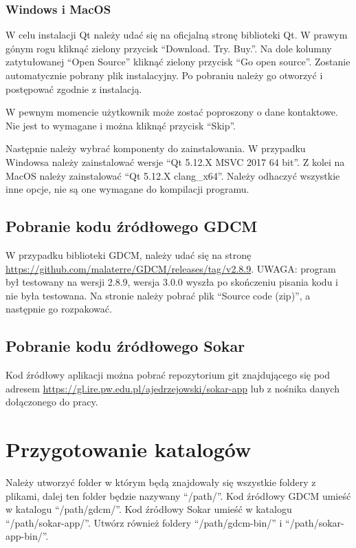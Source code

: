 \subsubsection*{Windows i MacOS}

\par
W celu instalacji Qt należy udać się na oficjalną stronę biblioteki Qt.
W prawym gónym rogu kliknąć zielony przycisk \enquote{Download. Try. Buy.}.
Na dole kolumny zatytułowanej \enquote{Open Source} kliknąć zielony przycisk \enquote{Go open source}.
Zostanie automatycznie pobrany plik instalacyjny.
Po pobraniu należy go otworzyć i postępować zgodnie z instalacją.
\par
W pewnym momencie użytkownik może zostać poproszony o dane kontaktowe.
Nie jest to wymagane i można kliknąć przycisk \enquote{Skip}.
\par
Następnie należy wybrać komponenty do zainstalowania.
W przypadku Windowsa należy zainstalować wersje \enquote{Qt 5.12.X MSVC 2017 64 bit}.
Z kolei na MacOS należy zainstalować \enquote{Qt 5.12.X clang\_x64}.
Należy odhaczyć wszystkie inne opcje, nie są one wymagane do kompilacji programu.

\subsection{Pobranie kodu źródłowego GDCM}

W przypadku biblioteki GDCM, należy udać się na stronę \url{https://github.com/malaterre/GDCM/releases/tag/v2.8.9}.
UWAGA: program był testowany na wersji 2.8.9, wersja 3.0.0 wyszła po skończeniu pisania kodu i nie była testowana.
Na stronie należy pobrać plik \enquote{Source code (zip)}, a następnie go rozpakować.

\subsection{Pobranie kodu źródłowego Sokar}

Kod źródłowy aplikacji można pobrać repozytorium git znajdującego się pod adresem \url{https://gl.ire.pw.edu.pl/ajedrzejowski/sokar-app} lub z nośnika danych dołączonego do pracy.

\section{Przygotowanie katalogów}

Należy utworzyć folder w którym będą znajdowały się wszystkie foldery z plikami, dalej ten folder będzie nazywany \enquote{/path/}.
Kod źródłowy GDCM umieść w katalogu \enquote{/path/gdcm/}.
Kod źródłowy Sokar umieść w katalogu \enquote{/path/sokar-app/}.
Utwórz również foldery \enquote{/path/gdcm-bin/} i \enquote{/path/sokar-app-bin/}.

